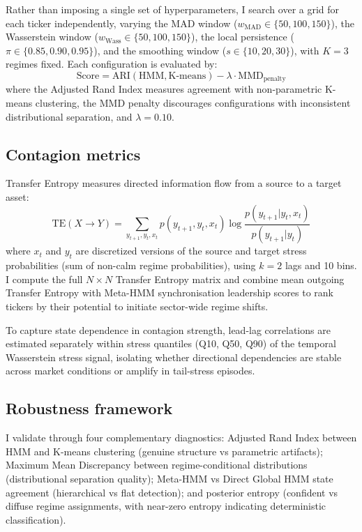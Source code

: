 \documentclass{article}
\begin{document}
Rather than imposing a single set of hyperparameters, I search over a grid for
each ticker independently, varying the MAD window ($w_{\text{MAD}} \in
\{50, 100, 150\}$), the Wasserstein window ($w_{\text{Wass}} \in
\{50, 100, 150\}$), the local persistence ($\pi \in \{0.85, 0.90, 0.95\}$),
and the smoothing window ($s \in \{10, 20, 30\}$), with $K = 3$ regimes fixed.
Each configuration is evaluated by:
\begin{equation}
\text{Score} = \text{ARI}(\text{HMM}, \text{K-means}) - \lambda \cdot
\text{MMD}_{\text{penalty}}
\end{equation}
where the Adjusted Rand Index measures agreement with non-parametric K-means
clustering, the MMD penalty discourages configurations with inconsistent
distributional separation, and $\lambda = 0.10$.

\subsection{Contagion metrics}
\label{sec:contagion}

Transfer Entropy measures directed information flow from a source to a target
asset:
\begin{equation}
\text{TE}(X \rightarrow Y) = \sum_{y_{t+1}, y_t, x_t} p(y_{t+1}, y_t, x_t)
\log \frac{p(y_{t+1} | y_t, x_t)}{p(y_{t+1} | y_t)}
\end{equation}
where $x_t$ and $y_t$ are discretized versions of the source and target stress
probabilities (sum of non-calm regime probabilities), using $k=2$ lags and 10
bins. I compute the full $N \times N$ Transfer Entropy matrix and combine mean
outgoing Transfer Entropy with Meta-HMM synchronisation leadership scores to
rank tickers by their potential to initiate sector-wide regime shifts.

To capture state dependence in contagion strength, lead-lag correlations are
estimated separately within stress quantiles (Q10, Q50, Q90) of the temporal
Wasserstein stress signal, isolating whether directional dependencies are stable
across market conditions or amplify in tail-stress episodes.

\subsection{Robustness framework}

I validate through four complementary diagnostics: Adjusted Rand Index between
HMM and K-means clustering (genuine structure vs parametric artifacts); Maximum
Mean Discrepancy between regime-conditional distributions (distributional
separation quality); Meta-HMM vs Direct Global HMM state agreement
(hierarchical vs flat detection); and posterior entropy (confident vs diffuse
regime assignments, with near-zero entropy indicating deterministic
classification).
\end{document}
